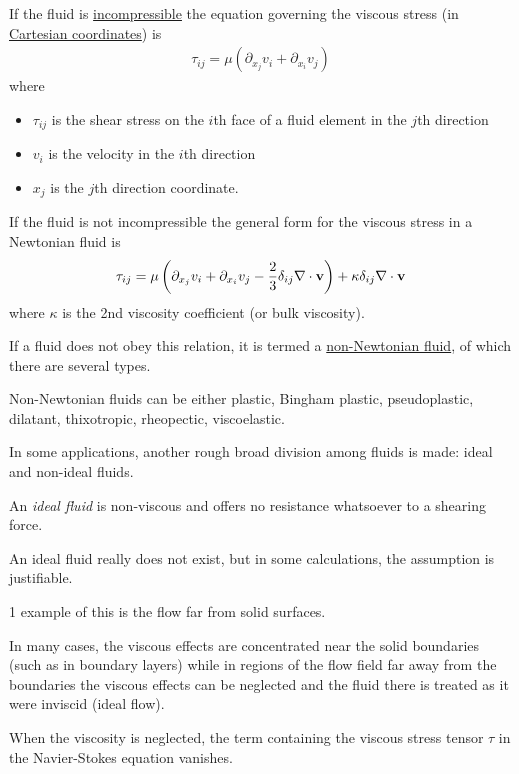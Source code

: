 \documentclass{article}
\begin{document}
If the fluid is \href{https://en.wikipedia.org/wiki/Incompressible_fluid}{incompressible} the equation governing the viscous stress (in \href{https://en.wikipedia.org/wiki/Cartesian_coordinate_system}{Cartesian coordinates}) is
\begin{align*}
	\tau_{ij} = \mu\left(\partial_{x_j}v_i + \partial_{x_i}v_j\right)
\end{align*}
where
\begin{itemize}
	\item $\tau_{ij}$ is the shear stress on the $i$th face of a fluid element in the $j$th direction
	\item $v_i$ is the velocity in the $i$th direction
	\item $x_j$ is the $j$th direction coordinate.
\end{itemize}
If the fluid is not incompressible the general form for the viscous stress in a Newtonian fluid is
\begin{align*}
	\tau_{ij} = \mu\left(\partial_{x_j}v_i + \partial_{x_i}v_j - \frac{2}{3}\delta_{ij}\nabla\cdot{\bf v}\right) + \kappa\delta_{ij}\nabla\cdot{\bf v}
\end{align*}
where $\kappa$ is the 2nd viscosity coefficient (or bulk viscosity).

If a fluid does not obey this relation, it is termed a \href{https://en.wikipedia.org/wiki/Non-Newtonian_fluid}{non-Newtonian fluid}, of which there are several types.

Non-Newtonian fluids can be either plastic, Bingham plastic, pseudoplastic, dilatant, thixotropic, rheopectic, viscoelastic.

%
In some applications, another rough broad division among fluids is made: ideal and non-ideal fluids.

An \textit{ideal fluid} is non-viscous and offers no resistance whatsoever to a shearing force.

An ideal fluid really does not exist, but in some calculations, the assumption is justifiable.

1 example of this is the flow far from solid surfaces.

In many cases, the viscous effects are concentrated near the solid boundaries (such as in boundary layers) while in regions of the flow field far away from the boundaries the viscous effects can be neglected and the fluid there is treated as it were inviscid (ideal flow).

When the viscosity is neglected, the term containing the viscous stress tensor $\tau$ in the Navier-Stokes equation vanishes.
\end{document}

